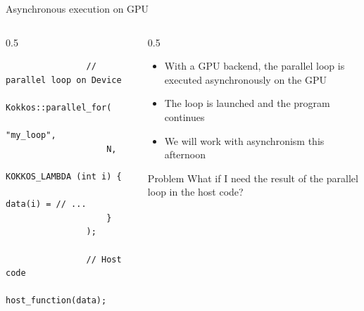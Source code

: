 \documentclass[
    aspectratio=169,
]{beamer}
\begin{document}
\begin{frame}[fragile]{Asynchronous execution on GPU}
    \begin{columns}
        \begin{column}{0.5\linewidth}
            \begin{verbatim}
                // parallel loop on Device
                Kokkos::parallel_for(
                    "my_loop",
                    N,
                    KOKKOS_LAMBDA (int i) {
                        data(i) = // ...
                    }
                );

                // Host code
                host_function(data);
            \end{verbatim}
        \end{column}
        \begin{column}{0.5\linewidth}
            \begin{itemize}
                \item With a GPU backend, the parallel loop is executed asynchronously on the GPU
                \item The loop is launched and the program continues
                \item We will work with asynchronism this afternoon
            \end{itemize}

            \pause

            \begin{block}{Problem}
                What if I need the result of the parallel loop in the host code?
            \end{block}
        \end{column}
    \end{columns}
\end{frame}
\end{document}
